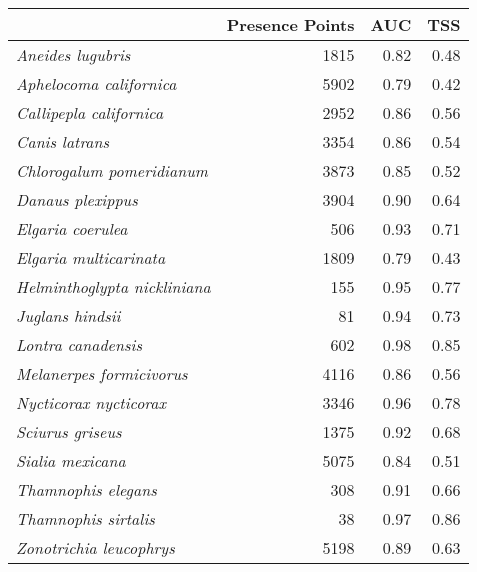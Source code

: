 \begin{longtable}{l|rrr}
\toprule
\multicolumn{1}{l}{} & Presence Points & AUC & TSS \\ 
\midrule
\textit{Aneides lugubris} & 1815 & 0.82 & 0.48 \\ 
\textit{Aphelocoma californica} & 5902 & 0.79 & 0.42 \\ 
\textit{Callipepla californica} & 2952 & 0.86 & 0.56 \\ 
\textit{Canis latrans} & 3354 & 0.86 & 0.54 \\ 
\textit{Chlorogalum pomeridianum} & 3873 & 0.85 & 0.52 \\ 
\textit{Danaus plexippus} & 3904 & 0.90 & 0.64 \\ 
\textit{Elgaria coerulea} & 506 & 0.93 & 0.71 \\ 
\textit{Elgaria multicarinata} & 1809 & 0.79 & 0.43 \\ 
\textit{Helminthoglypta nickliniana} & 155 & 0.95 & 0.77 \\ 
\textit{Juglans hindsii} & 81 & 0.94 & 0.73 \\ 
\textit{Lontra canadensis} & 602 & 0.98 & 0.85 \\ 
\textit{Melanerpes formicivorus} & 4116 & 0.86 & 0.56 \\ 
\textit{Nycticorax nycticorax} & 3346 & 0.96 & 0.78 \\ 
\textit{Sciurus griseus} & 1375 & 0.92 & 0.68 \\ 
\textit{Sialia mexicana} & 5075 & 0.84 & 0.51 \\ 
\textit{Thamnophis elegans} & 308 & 0.91 & 0.66 \\ 
\textit{Thamnophis sirtalis} & 38 & 0.97 & 0.86 \\ 
\textit{Zonotrichia leucophrys} & 5198 & 0.89 & 0.63 \\ 
\bottomrule
\end{longtable}

